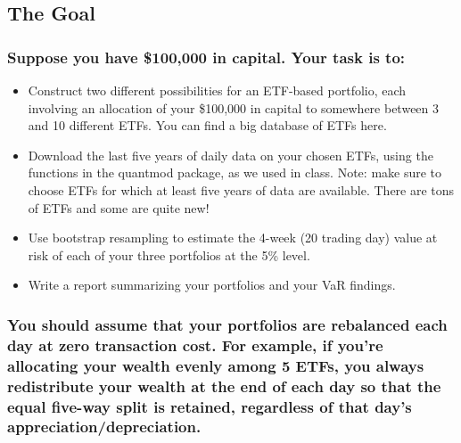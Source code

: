 \documentclass[
  12pt,
]{article}
\begin{document}
\hypertarget{the-goal}{%
\subsection{The Goal}\label{the-goal}}

\hypertarget{suppose-you-have-100000-in-capital.-your-task-is-to}{%
\subsubsection{Suppose you have \$100,000 in capital. Your task is
to:}\label{suppose-you-have-100000-in-capital.-your-task-is-to}}

\begin{itemize}
\item
  Construct two different possibilities for an ETF-based portfolio, each
  involving an allocation of your \$100,000 in capital to somewhere
  between 3 and 10 different ETFs. You can find a big database of ETFs
  here.
\item
  Download the last five years of daily data on your chosen ETFs, using
  the functions in the quantmod package, as we used in class. Note: make
  sure to choose ETFs for which at least five years of data are
  available. There are tons of ETFs and some are quite new!
\item
  Use bootstrap resampling to estimate the 4-week (20 trading day) value
  at risk of each of your three portfolios at the 5\% level.
\item
  Write a report summarizing your portfolios and your VaR findings.
\end{itemize}

\hypertarget{you-should-assume-that-your-portfolios-are-rebalanced-each-day-at-zero-transaction-cost.-for-example-if-youre-allocating-your-wealth-evenly-among-5-etfs-you-always-redistribute-your-wealth-at-the-end-of-each-day-so-that-the-equal-five-way-split-is-retained-regardless-of-that-days-appreciationdepreciation.}{%
\subsubsection{You should assume that your portfolios are rebalanced
each day at zero transaction cost. For example, if you're allocating
your wealth evenly among 5 ETFs, you always redistribute your wealth at
the end of each day so that the equal five-way split is retained,
regardless of that day's
appreciation/depreciation.}\label{you-should-assume-that-your-portfolios-are-rebalanced-each-day-at-zero-transaction-cost.-for-example-if-youre-allocating-your-wealth-evenly-among-5-etfs-you-always-redistribute-your-wealth-at-the-end-of-each-day-so-that-the-equal-five-way-split-is-retained-regardless-of-that-days-appreciationdepreciation.}}
\end{document}
